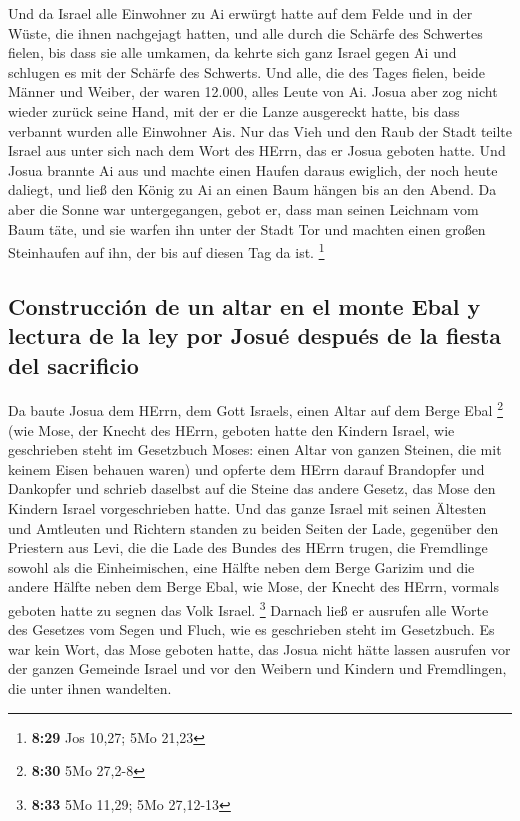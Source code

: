  Und da Israel alle Einwohner zu Ai erwürgt hatte auf dem
Felde und in der Wüste, die ihnen nachgejagt hatten, und alle durch die
Schärfe des Schwertes fielen, bis dass sie alle umkamen, da kehrte sich
ganz Israel gegen Ai und schlugen es mit der Schärfe des Schwerts.
 Und alle, die des Tages fielen, beide Männer und Weiber,
der waren 12.000, alles Leute von Ai.  Josua aber zog
nicht wieder zurück seine Hand, mit der er die Lanze ausgereckt hatte,
bis dass verbannt wurden alle Einwohner Ais.  Nur das
Vieh und den Raub der Stadt teilte Israel aus unter sich nach dem Wort
des HErrn, das er Josua geboten hatte.  Und Josua brannte
Ai aus und machte einen Haufen daraus ewiglich, der noch heute daliegt,
 und ließ den König zu Ai an einen Baum hängen bis an den
Abend. Da aber die Sonne war untergegangen, gebot er, dass man seinen
Leichnam vom Baum täte, und sie warfen ihn unter der Stadt Tor und
machten einen großen Steinhaufen auf ihn, der bis auf diesen Tag da ist.
\footnote{\textbf{8:29} Jos 10,27; 5Mo 21,23}

\hypertarget{construcciuxf3n-de-un-altar-en-el-monte-ebal-y-lectura-de-la-ley-por-josuuxe9-despuuxe9s-de-la-fiesta-del-sacrificio}{%
\subsection{Construcción de un altar en el monte Ebal y lectura de la
ley por Josué después de la fiesta del
sacrificio}\label{construcciuxf3n-de-un-altar-en-el-monte-ebal-y-lectura-de-la-ley-por-josuuxe9-despuuxe9s-de-la-fiesta-del-sacrificio}}

 Da baute Josua dem HErrn, dem Gott Israels, einen Altar
auf dem Berge Ebal \footnote{\textbf{8:30} 5Mo 27,2-8} 
(wie Mose, der Knecht des HErrn, geboten hatte den Kindern Israel, wie
geschrieben steht im Gesetzbuch Moses: einen Altar von ganzen Steinen,
die mit keinem Eisen behauen waren) und opferte dem HErrn darauf
Brandopfer und Dankopfer  und schrieb daselbst auf die
Steine das andere Gesetz, das Mose den Kindern Israel vorgeschrieben
hatte.  Und das ganze Israel mit seinen Ältesten und
Amtleuten und Richtern standen zu beiden Seiten der Lade, gegenüber den
Priestern aus Levi, die die Lade des Bundes des HErrn trugen, die
Fremdlinge sowohl als die Einheimischen, eine Hälfte neben dem Berge
Garizim und die andere Hälfte neben dem Berge Ebal, wie Mose, der Knecht
des HErrn, vormals geboten hatte zu segnen das Volk Israel. \footnote{\textbf{8:33}
  5Mo 11,29; 5Mo 27,12-13}  Darnach ließ er ausrufen alle
Worte des Gesetzes vom Segen und Fluch, wie es geschrieben steht im
Gesetzbuch.  Es war kein Wort, das Mose geboten hatte,
das Josua nicht hätte lassen ausrufen vor der ganzen Gemeinde Israel und
vor den Weibern und Kindern und Fremdlingen, die unter ihnen wandelten.


